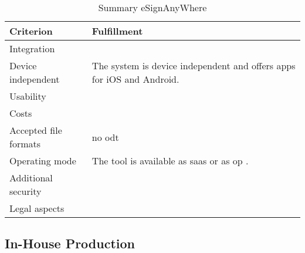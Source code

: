 \begin{table}[h!]
	\begin{tabular}{|p{4cm}|p{10cm}|} \hline
		Criterion & Fulfillment \\ \hline
		Integration & \\ \hline
		Device independent & The system is device independent and offers \glspl{app} for iOS and Android. \parencite{signAny2018info} \\ \hline
		Usability & \\ \hline
		Costs & \\ \hline
		Accepted file formats & no odt \\ \hline
		Operating mode &  The tool is available as \gls{saas} or as \gls{op} \parencite{signAny2018info}. \\ \hline
		Additional security & \\ \hline
		Legal aspects & \\ \hline
	\end{tabular}
	\caption{Summary eSignAnyWhere}
	\label{tab:esignany}
\end{table}

\subsection{In-House Production}
